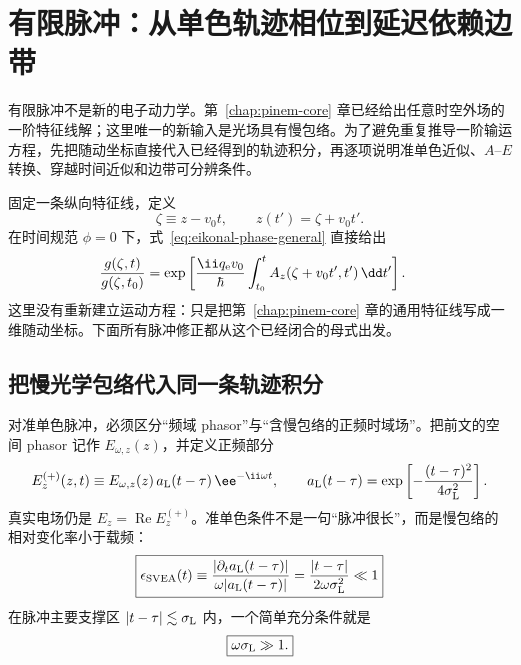 \chapter{有限脉冲：从单色轨迹相位到延迟依赖边带}
\label{chap:pulses}

有限脉冲不是新的电子动力学。第~\ref{chap:pinem-core} 章已经给出任意时空外场的一阶特征线解；这里唯一的新输入是光场具有慢包络。为了避免重复推导一阶输运方程，先把随动坐标直接代入已经得到的轨迹积分，再逐项说明准单色近似、$A$--$E$ 转换、穿越时间近似和边带可分辨条件。

固定一条纵向特征线，定义
\begin{equation}
\zeta\equiv z-v_0t,\qquad z(t')=\zeta+v_0t'.
\label{eq:moving-coordinate}
\end{equation}
在时间规范 $\phi=0$ 下，式~\eqref{eq:eikonal-phase-general} 直接给出
\begin{align}
\frac{g(\zeta,t)}{g(\zeta,t_0)}
&=\exp\left[
\frac{\ii q_{\rm e}v_0}{\hbar}
\int_{t_0}^{t} A_z(\zeta+v_0t',t')\,\dd t'
\right].
\label{eq:g-integral}
\end{align}
这里没有重新建立运动方程：只是把第~\ref{chap:pinem-core} 章的通用特征线写成一维随动坐标。下面所有脉冲修正都从这个已经闭合的母式出发。

\section{把慢光学包络代入同一条轨迹积分}

对准单色脉冲，必须区分“频域 phasor”与“含慢包络的正频时域场”。把前文的空间 phasor 记作 $E_{\omega,z}(z)$，并定义正频部分
\begin{equation}
 E_z^{(+)}(z,t)
 \equiv E_{\omega,z}(z)\,
 a_{\rm L}(t-\tau)\,
 \ee^{-\ii\omega t},
 \qquad
 a_{\rm L}(t-\tau)
 =\exp\left[-\frac{(t-\tau)^2}{4\sigma_{\mathrm L}^2}\right].
 \label{eq:complex-field}
\end{equation}
真实电场仍是 $E_z=\operatorname{Re}E_z^{(+)}$。准单色条件不是一句“脉冲很长”，而是慢包络的相对变化率小于载频：
\begin{equation}
 \boxed{
 \epsilon_{\rm SVEA}(t)
 \equiv
 \frac{|\partial_t a_{\rm L}(t-\tau)|}
 {\omega |a_{\rm L}(t-\tau)|}
 =
 \frac{|t-\tau|}{2\omega\sigma_{\rm L}^2}
 \ll1}
 \label{eq:SVEA-field-condition}
\end{equation}
在脉冲主要支撑区 $|t-\tau|\lesssim\sigma_{\rm L}$ 内，一个简单充分条件就是
\begin{equation}
 \boxed{\omega\sigma_{\rm L}\gg1.}
 \label{eq:quasimonochromatic-condition}
\end{equation}

